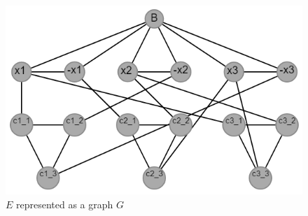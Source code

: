 \documentclass{article}
\theoremstyle{definition}
\begin{document}
\begin{figure}[H]
\centering
\includegraphics[scale=0.6]{images/3sat-1.png}
\caption{\(E\) represented as a graph \(G\)}
\end{figure}


\newpage



\end{document}
